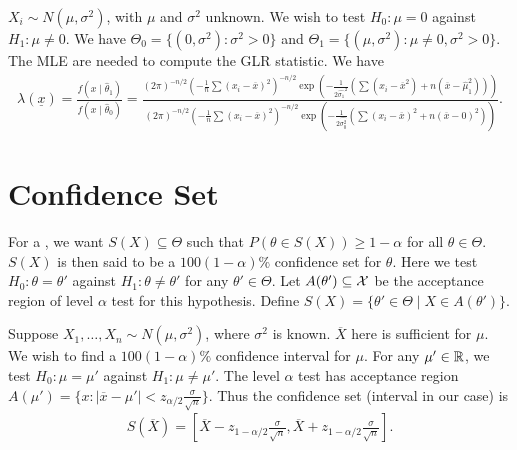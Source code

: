 \begin{example}
    $X_{i} \sim N(\mu,\sigma^{2})$, with $\mu$ and $\sigma^{2}$ unknown. We wish to test $H_{0}:\mu = 0$ against $H_{1}:\mu \neq 0$. We have $\Theta_{0} = \{(0,\sigma^{2}):\sigma^{2} > 0\}$ and $\Theta_{1} = \{(\mu,\sigma^{2}):\mu \neq 0, \sigma^{2} > 0\}$. The MLE are needed to compute the GLR statistic. We have
    \begin{align}
        \lambda(\underline{x}) = \frac{f(x \mid \hat{\theta}_{1})}{f(x \mid \hat{\theta}_{0})} = \frac{(2\pi)^{-n/2} (-\frac{1}{n} \sum (x_{i}-\overline{x})^{2})^{-n/2} \exp(-\frac{1}{2\hat{\sigma_{1}}^{2}}(\sum (x_{i}-\overline{x}^{2})+n(\overline{x}-\hat{\mu}_{1}^{2})))}{(2\pi)^{-n/2} (-\frac{1}{n} \sum (x_{i}-\overline{x})^{2})^{-n/2} \exp(-\frac{1}{2\hat{\sigma_{0}^{2}}}(\sum (x_{i}-\overline{x})^{2}+n(\overline{x}-0)^{2}))}.
    \end{align}
\end{example}

\section{Confidence Set}

For a , we want $S(X) \subseteq \Theta$ such that $P(\theta \in S(X)) \geq 1 - \alpha$ for all $\theta \in \Theta$. $S(X)$ is then said to be a $100(1-\alpha)\%$ confidence set for $\theta$. Here we test $H_{0}:\theta = \theta'$ against $H_{1}:\theta \neq \theta'$ for any $\theta' \in \Theta$. Let $A(\theta') \subseteq \mathcal{X}$ be the acceptance region of level $\alpha$ test for this hypothesis. Define $S(X) = \{\theta' \in \Theta \mid X \in A(\theta')\}$.

\begin{example}
    Suppose $X_{1},\ldots,X_{n} \sim N(\mu,\sigma^{2})$, where $\sigma^{2}$ is known. $\overline{X}$ here is sufficient for $\mu$. We wish to find a $100(1-\alpha)\%$ confidence interval for $\mu$. For any $\mu' \in \mathbb{R}$, we test $H_{0}:\mu = \mu'$ against $H_{1}:\mu \neq \mu'$. The level $\alpha$ test has acceptance region $A(\mu') = \{x : |\overline{x} - \mu'| < z_{\alpha/2} \frac{\sigma}{\sqrt{n}}\}$. Thus the confidence set (interval in our case) is
    \begin{align}
        S(\overline{X}) = \left[ \overline{X} - z_{1-\alpha/2} \frac{\sigma}{\sqrt{n}}, \overline{X} + z_{1-\alpha/2} \frac{\sigma}{\sqrt{n}} \right].
    \end{align}
\end{example}

